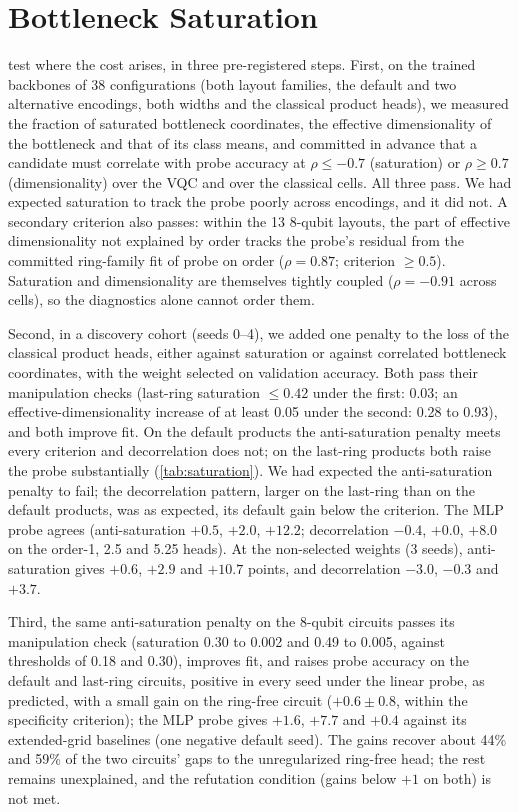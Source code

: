 

\section{Bottleneck Saturation}
\label{app:saturation}

 test where the cost arises, in three pre-registered steps. First,
on the trained backbones of 38 configurations (both layout families, the default and two alternative
encodings, both widths and the classical product heads), we measured the fraction of saturated bottleneck
coordinates, the effective dimensionality of the bottleneck and that of its class means, and committed in
advance that a candidate must correlate with probe accuracy at $\rho\le-0.7$ (saturation) or
$\rho\ge0.7$ (dimensionality) over the VQC and over the classical cells. All three pass. We had expected
saturation to track the probe poorly across encodings, and it did not. A secondary criterion also
passes: within the 13 8-qubit layouts, the part of effective dimensionality not explained by order
tracks the probe's residual from the committed ring-family fit of probe on order ($\rho=0.87$; criterion $\ge0.5$). Saturation
and dimensionality are themselves tightly coupled ($\rho=-0.91$ across cells), so the diagnostics alone
cannot order them.

Second, in a discovery cohort (seeds 0--4), we added one penalty to the loss of the classical product
heads, either against saturation or against correlated bottleneck coordinates, with the weight selected
on validation accuracy. Both pass their manipulation checks (last-ring saturation $\le0.42$ under the
first: 0.03; an effective-dimensionality increase of at least 0.05 under the second: 0.28 to 0.93), and
both improve fit. On the default products the anti-saturation penalty meets every criterion and
decorrelation does not; on the last-ring products both raise the probe substantially
(\cref{tab:saturation}). We had expected the anti-saturation penalty to fail; the decorrelation pattern,
larger on the last-ring than on the default products, was as expected, its default gain below the
criterion. The MLP probe agrees (anti-saturation $+0.5$, $+2.0$, $+12.2$; decorrelation $-0.4$, $+0.0$,
$+8.0$ on the order-1, 2.5 and 5.25 heads). At the non-selected weights (3 seeds), anti-saturation gives
$+0.6$, $+2.9$ and $+10.7$ points, and decorrelation $-3.0$, $-0.3$ and $+3.7$.

Third, the same anti-saturation penalty on the 8-qubit circuits passes its manipulation check
(saturation 0.30 to 0.002 and 0.49 to 0.005, against thresholds of 0.18 and 0.30), improves fit, and
raises probe accuracy on the default and last-ring circuits, positive in every seed under the linear
probe, as predicted, with a small gain on the ring-free circuit ($+0.6\pm0.8$, within the specificity
criterion); the MLP probe gives $+1.6$, $+7.7$ and $+0.4$ against its extended-grid baselines (one negative default seed). The gains recover
about 44\% and 59\% of the two circuits' gaps to the unregularized ring-free head; the rest remains
unexplained, and the refutation condition (gains below $+1$ on both) is not met.

